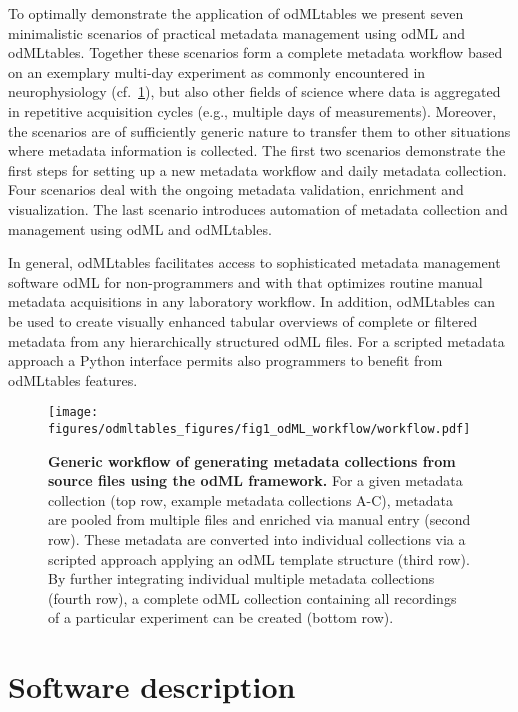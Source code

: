{To optimally demonstrate the application of odMLtables we present seven minimalistic scenarios of practical metadata management using odML and odMLtables. Together these scenarios form a complete metadata workflow based on an exemplary multi-day experiment as commonly encountered in neurophysiology (cf.~\cref{fig:odMLgeneration}), but also other fields of science where data is aggregated in repetitive acquisition cycles (e.g., multiple days of measurements). Moreover, the scenarios are of sufficiently generic nature to transfer them to other situations where metadata information is collected. The first two scenarios demonstrate the first steps for setting up a new metadata workflow and daily metadata collection. Four scenarios deal with the ongoing metadata validation, enrichment and visualization. The last scenario introduces automation of metadata collection and management using odML and odMLtables.

In general, odMLtables facilitates access to sophisticated metadata management software odML for non-programmers and with that optimizes routine manual metadata acquisitions in any laboratory workflow. In addition, odMLtables can be used to create visually enhanced tabular overviews of complete or filtered metadata from any hierarchically structured odML files. For a scripted metadata approach a Python interface permits also programmers to benefit from odMLtables features.

\begin{figure}[!ht]
\begin{center}
\texttt{[image: figures/odmltables\_figures/fig1\_odML\_workflow/workflow.pdf]}
\caption[Generic workflow of generating metadata collections from source files using the odML framework]{{\label{fig:odMLgeneration}
\textbf{Generic workflow of generating metadata collections from source files using the odML framework.} For a given metadata collection (top row, example metadata collections A-C), metadata are pooled from multiple files and enriched via manual entry (second row). These metadata are converted into individual collections via a scripted approach applying an odML template structure (third row). By further integrating individual multiple metadata collections (fourth row), a complete odML collection containing all recordings of a particular experiment can be created (bottom row).
}}
\end{center}
\end{figure}

\section{Software description}
\label{sec:Software}

}
